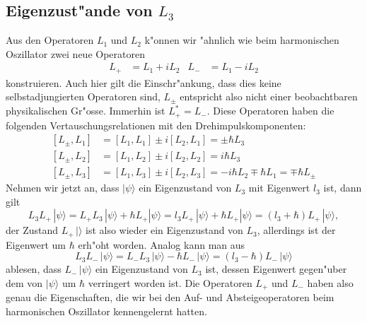 \subsection{Eigenzust"ande von $L_3$}
Aus den Operatoren $L_1$ und $L_2$ k"onnen wir "ahnlich wie beim
harmonischen Oszillator zwei neue Operatoren
\begin{align*}
L_+&=L_1+iL_2
&
L_-&=L_1-iL_2
\end{align*}
konstruieren.
Auch hier gilt die Einschr"ankung, dass dies keine selbstadjungierten
Operatoren sind, $L_\pm$ entspricht also nicht einer beobachtbaren
physikalischen Gr"osse. 
Immerhin ist $L_+^*=L_-$.
Diese Operatoren haben die folgenden Vertauschungsrelationen mit
den Drehimpulskomponenten:
\begin{equation}
\begin{aligned} 
\phantom{ }	%
[L_\pm, L_1]
&=
[L_1,L_1]\pm i[L_2,L_1]
=
\pm \hbar L_3
\\
[L_\pm, L_2]
&=
[L_1,L_2]\pm i[L_2,L_2]
=
i\hbar L_3
\\
[L_\pm,L_3]
&=
[L_1,L_3]\pm i[L_2,L_3]
=
-i\hbar L_2
\mp
\hbar L_1
=
\mp \hbar L_\pm
\end{aligned}
\label{lpmlkommutator}
\end{equation}
Nehmen wir jetzt an, dass $|\psi\rangle$ ein Eigenzustand von $L_3$ mit
Eigenwert $l_3$ ist, dann gilt
\[
L_3L_+\,|\psi\rangle
=
L_+L_3\,|\psi\rangle+\hbar L_+|\psi\rangle
=
l_3L_+\,|\psi\rangle+\hbar L_+|\psi\rangle
=
(l_3+\hbar)L_+\,|\psi\rangle,
\]
der Zustand $L_+\,|\rangle$ ist also wieder ein Eigenzustand von $L_3$,
allerdings ist der Eigenwert um $\hbar$ erh"oht worden.
Analog kann man aus
\[
L_3L_-\,|\psi\rangle
=
L_-L_3\,|\psi\rangle-\hbar L_-\,|\psi\rangle
=
(l_3-\hbar)L_-\,|\psi\rangle
\]
ablesen,  dass $L_-\,|\psi\rangle$ ein Eigenzustand von $L_3$ ist, dessen
Eigenwert gegen"uber dem von $|\psi\rangle$ um $\hbar$ verringert
worden ist.
Die Operatoren $L_+$ und $L_-$ haben also genau die Eigenschaften,
die wir bei den Auf- und Absteigeoperatoren beim harmonischen Oszillator
kennengelernt hatten.

